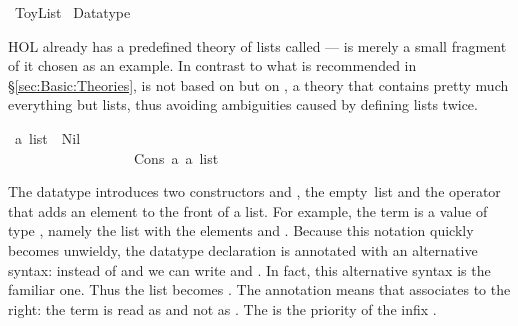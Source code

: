 %
\begin{isabellebody}%
\def\isabellecontext{ToyList}%
%
\isadelimtheory
%
\endisadelimtheory
%
\isatagtheory
{}\isamarkupfalse%
\ ToyList\isanewline
{}\ Datatype\isanewline
{}%
\endisatagtheory
{\isafoldtheory}%
%
\isadelimtheory
%
\endisadelimtheory
%
\begin{isamarkuptext}%
\noindent
HOL already has a predefined theory of lists called  ---
 is merely a small fragment of it chosen as an example. In
contrast to what is recommended in \S\ref{sec:Basic:Theories},
 is not based on  but on , a
theory that contains pretty much everything but lists, thus avoiding
ambiguities caused by defining lists twice.%
\end{isamarkuptext}%
\isamarkuptrue%
\isamarkupfalse%
\ {\isacharprime}a\ list\ {\isacharequal}\ Nil\ \ \ \ \ \ \ \ \ \ \ \ \ \ \ \ \ \ \ \ \ \ \ \ \ \ {\isacharparenleft}{\isachardoublequoteopen}{\isacharbrackleft}{\isacharbrackright}{\isachardoublequoteclose}{\isacharparenright}\isanewline
\ \ \ \ \ \ \ \ \ \ \ \ \ \ \ \ \ {\isacharbar}\ Cons\ {\isacharprime}a\ {\isachardoublequoteopen}{\isacharprime}a\ list{\isachardoublequoteclose}\ \ \ \ \ \ \ \ \ \ \ \ {\isacharparenleft}\ {\isachardoublequoteopen}{\isacharhash}{\isachardoublequoteclose}\ {}{}{\isacharparenright}%
\begin{isamarkuptext}%
\noindent
The datatype
 introduces two
constructors  and , the
empty~list and the operator that adds an element to the front of a list. For
example, the term  is a value of
type , namely the list with the elements  and
. Because this notation quickly becomes unwieldy, the
datatype declaration is annotated with an alternative syntax: instead of
 and  we can write
\isa{{\isacharbrackleft}{\isacharbrackright}} and
. In fact, this
alternative syntax is the familiar one.  Thus the list  becomes . The annotation
means that \isa{{\isacharhash}} associates to
the right: the term  is read as 
and not as .
The  is the priority of the infix \isa{{\isacharhash}}.


\end{isamarkuptext}
\end{isabellebody}
